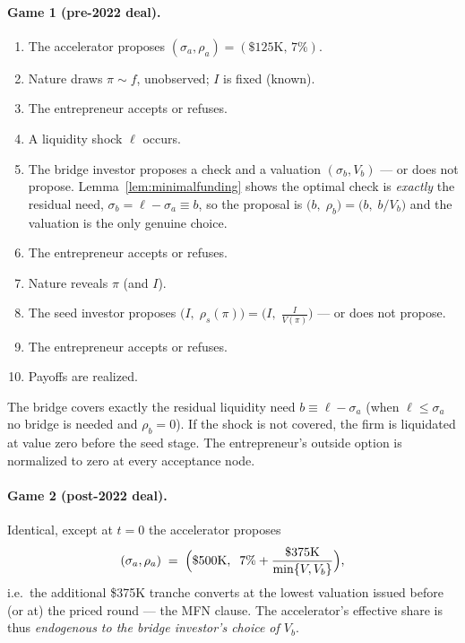 \documentclass[11pt]{article}
\theoremstyle{definition}
\begin{document}
\paragraph{Game 1 (pre-2022 deal).}
\begin{enumerate}[label={$t=\arabic*$:}, start=0, leftmargin=3.2em, itemsep=0pt]
\item The accelerator proposes $(\sigma_a, \rho_a) = (\$125\text{K},\, 7\%)$.
\item Nature draws $\pi \sim f$, unobserved; $I$ is fixed (known).
\item The entrepreneur accepts or refuses.
\item A liquidity shock $\ell$ occurs.
\item The bridge investor proposes a check and a valuation $(\sigma_b, V_b)$ --- or does not propose. Lemma~\ref{lem:minimalfunding} shows the optimal check is \emph{exactly} the residual need, $\sigma_b=\ell-\sigma_a\equiv b$, so the proposal is $\bigl(b,\;\rho_b\bigr)=\bigl(b,\;b/V_b\bigr)$ and the valuation is the only genuine choice.
\item The entrepreneur accepts or refuses.
\item Nature reveals $\pi$ (and $I$).
\item The seed investor proposes $\bigl(I,\; \rho_s(\pi)\bigr) = \bigl(I,\; \tfrac{I}{V(\pi)}\bigr)$ --- or does not propose.
\item The entrepreneur accepts or refuses.
\item Payoffs are realized.
\end{enumerate}

The bridge covers exactly the residual liquidity need $b \equiv \ell - \sigma_a$ (when $\ell \le \sigma_a$ no bridge is needed and $\rho_b = 0$). If the shock is not covered, the firm is liquidated at value zero before the seed stage. The entrepreneur's outside option is normalized to zero at every acceptance node.

\paragraph{Game 2 (post-2022 deal).} Identical, except at $t=0$ the accelerator proposes
\[
(\sigma_a, \rho_a) \;=\; \Bigl(\$500\text{K},\;\; 7\% + \frac{\$375\text{K}}{\min\{V, V_b\}}\Bigr),
\]
i.e.\ the additional \$375K tranche converts at the lowest valuation issued before (or at) the priced round --- the MFN clause. The accelerator's effective share is thus \emph{endogenous to the bridge investor's choice of $V_b$}.
\end{document}
